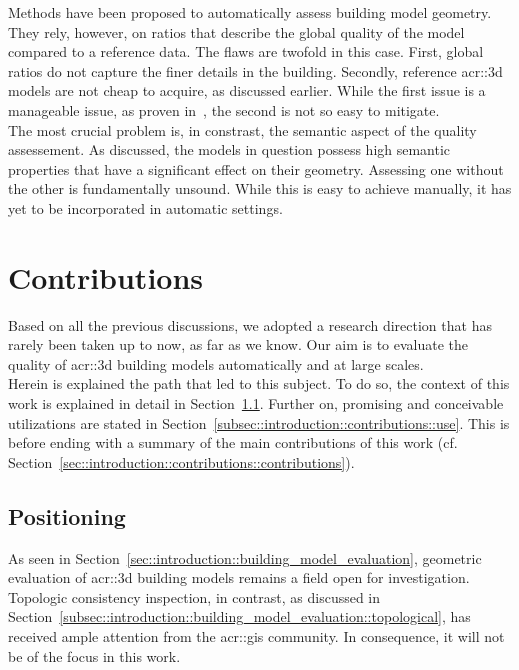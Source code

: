             Methods have been proposed to automatically assess building model geometry.
            They rely, however, on ratios that describe the global quality of the model compared to a reference data.
            The flaws are twofold in this case.
            First, global ratios do not capture the finer details in the building.
            Secondly, reference \gls{acr::3d} models are not cheap to acquire, as discussed earlier.
            While the first issue is a manageable issue, as proven in~\parencite{rottensteiner2012isprs}, the second is not so easy to mitigate.\\

            The most crucial problem is, in constrast, the semantic aspect of the quality assessement.
            As discussed, the models in question possess high semantic properties that have a significant effect on their geometry.
            Assessing one without the other is fundamentally unsound.
            While this is easy to achieve manually, it has yet to be incorporated in automatic settings.
\section{Contributions}
    \label{sec::introduction::contributions}
    Based on all the previous discussions, we adopted a research direction that has rarely been taken up to now, as far as we know.
    Our aim is to evaluate the quality of \gls{acr::3d} building models automatically and at large scales.\\

    Herein is explained the path that led to this subject.
    To do so, the context of this work is explained in detail in Section~\ref{subsec::introduction::contributions::positioning}.
    Further on, promising and conceivable utilizations are stated in Section~\ref{subsec::introduction::contributions::use}.
    This is before ending with a summary of the main contributions of this work (cf. Section~\ref{sec::introduction::contributions::contributions}).
    
    \subsection{Positioning}
        \label{subsec::introduction::contributions::positioning}
        As seen in Section~\ref{sec::introduction::building_model_evaluation}, geometric evaluation of \gls{acr::3d} building models remains a field open for investigation.
        Topologic consistency inspection, in contrast, as discussed in Section~\ref{subsec::introduction::building_model_evaluation::topological}, has received ample attention from the \gls{acr::gis} community.
        In consequence, it will not be of the focus in this work.\\

